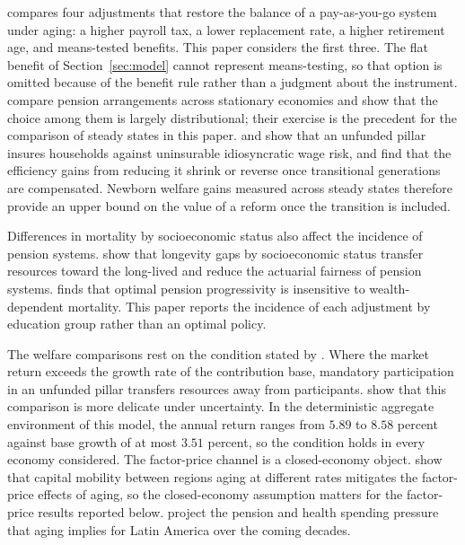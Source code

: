 \citet{Kitao2014} compares four adjustments that restore the balance of a pay-as-you-go system under aging: a higher payroll tax, a lower replacement rate, a higher retirement age, and means-tested benefits. This paper considers the first three. The flat benefit of Section~\ref{sec:model} cannot represent means-testing, so that option is omitted because of the benefit rule rather than a judgment about the instrument. \citet{HuggettVentura1999} compare pension arrangements across stationary economies and show that the choice among them is largely distributional; their exercise is the precedent for the comparison of steady states in this paper. \citet{ConesaKrueger1999} and \citet{NishiyamaSmetters2007} show that an unfunded pillar insures households against uninsurable idiosyncratic wage risk, and \citet{NishiyamaSmetters2007} find that the efficiency gains from reducing it shrink or reverse once transitional generations are compensated. Newborn welfare gains measured across steady states therefore provide an upper bound on the value of a reform once the transition is included.

Differences in mortality by socioeconomic status also affect the incidence of pension systems. \citet{SanchezRomeroEtAl2020} show that longevity gaps by socioeconomic status transfer resources toward the long-lived and reduce the actuarial fairness of pension systems. \citet{Bagchi2019} finds that optimal pension progressivity is insensitive to wealth-dependent mortality. This paper reports the incidence of each adjustment by education group rather than an optimal policy.

The welfare comparisons rest on the condition stated by \citet{Aaron1966}. Where the market return exceeds the growth rate of the contribution base, mandatory participation in an unfunded pillar transfers resources away from participants. \citet{AbelEtAl1989} show that this comparison is more delicate under uncertainty. In the deterministic aggregate environment of this model, the annual return ranges from $5.89$ to $8.58$ percent against base growth of at most $3.51$ percent, so the condition holds in every economy considered. The factor-price channel is a closed-economy object. \citet{AttanasioKitaoViolante2007} show that capital mobility between regions aging at different rates mitigates the factor-price effects of aging, so the closed-economy assumption matters for the factor-price results reported below. \citet{PessinoTerMinassian2021} project the pension and health spending pressure that aging implies for Latin America over the coming decades.

